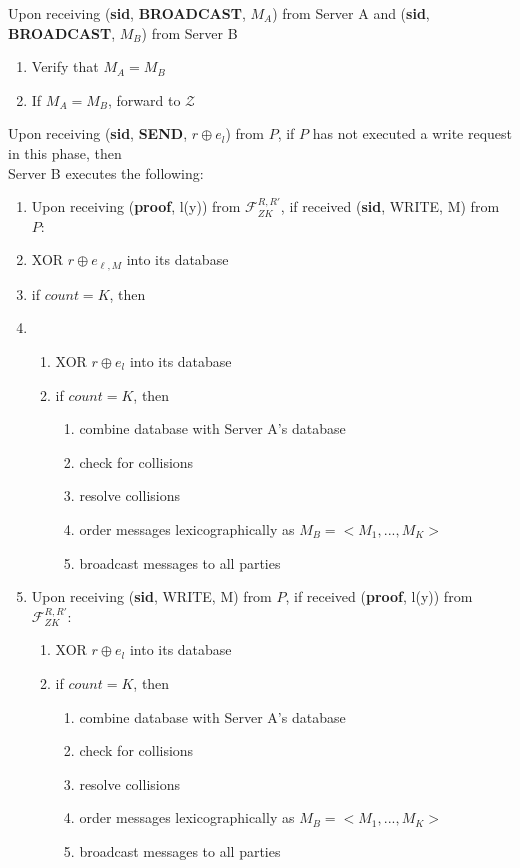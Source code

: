 \begin{tcolorbox}[colback=white, arc=5pt]
\extitem Upon receiving (\textbf{sid}, \textbf{BROADCAST}, $M_A$) from Server A and (\textbf{sid}, \textbf{BROADCAST}, $M_B$) from Server B
\begin{enumerate}
    \item Verify that $M_A = M_B$
    \item If $M_A = M_B$, forward to $\mathcal{Z}$
\end{enumerate}

\extitem Upon receiving (\textbf{sid}, \textbf{SEND}, $r\oplus e_l$) from $P$, if $P$ has not executed a write request in this phase, then \\
    Server B executes the following:
    
    \begin{enumerate}
        \item Upon receiving (\textbf{proof}, l(y)) from $\mathcal{F}_{ZK}^{R,R'}$, if received (\textbf{sid}, WRITE, M) from $P$:
        \item XOR $r\oplus e_{\ell,M}$ into its database  
        \item if $count=K$, then
        \item 
        \begin{enumerate}
            \item XOR $r\oplus e_l$ into its database  
            \item if $count=K$, then
            \begin{enumerate}
                \item combine database with Server A's database
                \item check for collisions
                \item resolve collisions
                \item order messages lexicographically as $M_B=<M_1,...,M_K>$
                \item broadcast messages to all parties
            \end{enumerate}
        \end{enumerate}
        \item Upon receiving (\textbf{sid}, WRITE, M) from $P$, if received (\textbf{proof}, l(y)) from $\mathcal{F}_{ZK}^{R,R'}$:
        \begin{enumerate}
            \item XOR $r\oplus e_l$ into its database  
            \item if $count=K$, then
            \begin{enumerate}
                \item combine database with Server A's database
                \item check for collisions
                \item resolve collisions
                \item order messages lexicographically as $M_B=<M_1,...,M_K>$
                \item broadcast messages to all parties
            \end{enumerate}
        \end{enumerate}
    \end{enumerate}


\end{tcolorbox}
